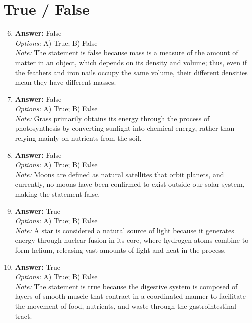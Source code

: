 \documentclass[12pt]{article}
\begin{document}
\section*{True / False}
\begin{enumerate}[label=\arabic*.]
\setcounter{enumi}{5}
\item \textbf{Answer:} False
\\ \textit{Options:} A) True; B) False
\\ \textit{Note:} The statement is false because mass is a measure of the amount of matter in an object, which depends on its density and volume; thus, even if the feathers and iron nails occupy the same volume, their different densities mean they have different masses.
\item \textbf{Answer:} False
\\ \textit{Options:} A) True; B) False
\\ \textit{Note:} Grass primarily obtains its energy through the process of photosynthesis by converting sunlight into chemical energy, rather than relying mainly on nutrients from the soil.
\item \textbf{Answer:} False
\\ \textit{Options:} A) True; B) False
\\ \textit{Note:} Moons are defined as natural satellites that orbit planets, and currently, no moons have been confirmed to exist outside our solar system, making the statement false.
\item \textbf{Answer:} True
\\ \textit{Options:} A) True; B) False
\\ \textit{Note:} A star is considered a natural source of light because it generates energy through nuclear fusion in its core, where hydrogen atoms combine to form helium, releasing vast amounts of light and heat in the process.
\item \textbf{Answer:} True
\\ \textit{Options:} A) True; B) False
\\ \textit{Note:} The statement is true because the digestive system is composed of layers of smooth muscle that contract in a coordinated manner to facilitate the movement of food, nutrients, and waste through the gastrointestinal tract.
\end{enumerate}
\end{document}
